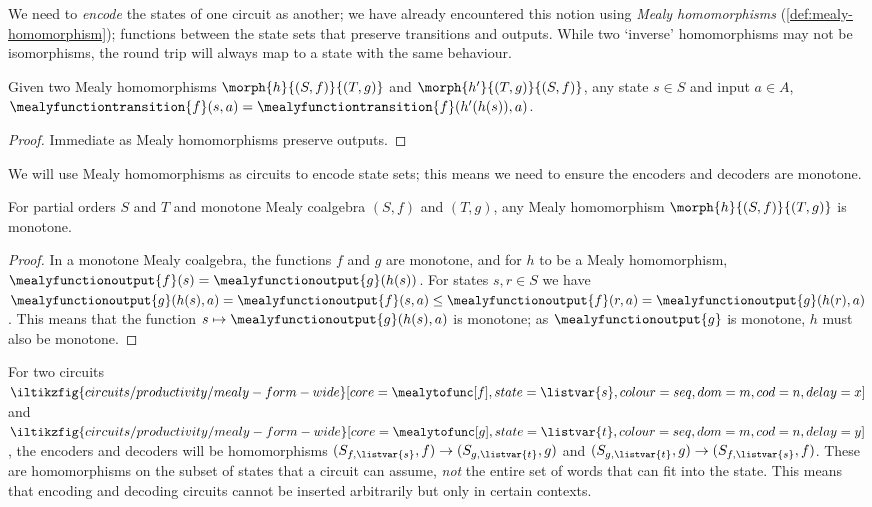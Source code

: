 We need to \emph{encode} the states of one circuit as another; we have already
encountered this notion using \emph{Mealy homomorphisms}
(\cref{def:mealy-homomorphism});
functions between the state sets that preserve transitions and outputs.
While two `inverse' homomorphisms may not be isomorphisms, the round
trip will always map to a state with the same behaviour.

\begin{lemma}
    Given two Mealy homomorphisms \(\morph{h}{(S,f)}{(T,g)}\) and
    \(\morph{h^\prime}{(T,g)}{(S,f)}\), any state \(s \in S\) and input
    \(a \in A\), \(
    \mealyfunctiontransition{f}(s, a)
    =
    \mealyfunctiontransition{f}(h^\prime(h(s)), a)
    \).
\end{lemma}
\begin{proof}
    Immediate as Mealy homomorphisms preserve outputs.
\end{proof}

We will use Mealy homomorphisms as circuits to encode state sets; this means we
need to ensure the encoders and decoders are monotone.

\begin{lemma}
    For partial orders \(S\) and \(T\) and monotone Mealy coalgebra
    \((S,f)\) and \((T,g)\), any Mealy homomorphism \(\morph{h}{(S,f)}{(T,g)}\)
    is monotone.
\end{lemma}
\begin{proof}
    In a monotone Mealy coalgebra, the functions \(f\) and \(g\) are monotone,
    and for \(h\) to be a Mealy homomorphism, \(
    \mealyfunctionoutput{f}(s)
    =
    \mealyfunctionoutput{g}(h(s))
    \).
    For states \(s,r \in S\) we have \(
    \mealyfunctionoutput{g}(h(s), a)
    =
    \mealyfunctionoutput{f}(s, a)
    \leq
    \mealyfunctionoutput{f}(r, a)
    =
    \mealyfunctionoutput{g}(h(r), a)
    \).
    This means that the function \(
    s \mapsto \mealyfunctionoutput{g}(h(s), a)
    \) is monotone; as \(\mealyfunctionoutput{g}\) is monotone, \(h\) must
    also be monotone.
\end{proof}

For two circuits \(
\iltikzfig{circuits/productivity/mealy-form-wide}[core=\mealytofunc[f],state=\listvar{s},colour=seq,dom=m,cod=n,delay=x]
\) and \(
\iltikzfig{circuits/productivity/mealy-form-wide}[core=\mealytofunc[g],state=\listvar{t},colour=seq,dom=m,cod=n,delay=y]
\), the encoders and decoders will be homomorphisms
\((S_{f,\listvar{s}},f) \to (S_{g,\listvar{t}},g)\)
and
\((S_{g,\listvar{t}},g) \to (S_{f,\listvar{s}},f)\).
These are homomorphisms on the subset of states that a circuit
can assume, \emph{not} the entire set of words that can fit into the state.
This means that encoding and decoding circuits cannot be inserted arbitrarily
but only in certain contexts.

